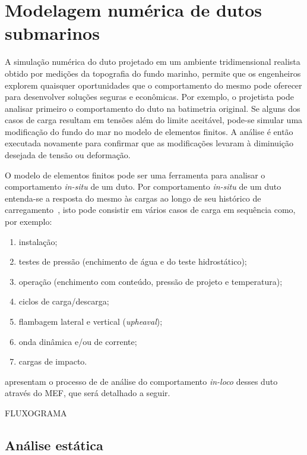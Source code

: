 \section{Modelagem numérica de dutos submarinos\label{chap:assentamento}}


A simulação numérica do duto projetado em um ambiente tridimensional realista obtido por medições da topografia do fundo marinho, permite que os engenheiros explorem quaisquer oportunidades que o comportamento do mesmo pode oferecer para desenvolver soluções seguras e econômicas.
Por exemplo, o projetista pode analisar primeiro o comportamento do duto na batimetria original.
Se alguns dos casos de carga resultam em tensões além do limite aceitável, pode-se simular uma modificação do fundo do mar no modelo de elementos finitos.
A análise é então executada novamente para confirmar que as modificações levaram à diminuição desejada de tensão ou deformação.

O modelo de elementos finitos pode ser uma ferramenta para analisar o comportamento \textit{in-situ} de um duto.
Por comportamento \textit{in-situ} de um duto entenda-se a resposta do mesmo às cargas ao longo de seu histórico de carregamento~\cite{Bai2014}, isto pode consistir em vários casos de carga em sequência como, por exemplo:

\begin{enumerate}
    \item instalação;
    \item testes de pressão (enchimento de água e do teste hidrostático);
    \item operação (enchimento com conteúdo, pressão de projeto e temperatura);
    \item ciclos de carga/descarga;
    \item flambagem lateral e vertical (\textit{upheaval});
    \item onda dinâmica e/ou de corrente;
    \item cargas de impacto.
\end{enumerate}

 apresentam o processo de de análise do comportamento \textit{in-loco} desses duto através do  MEF, que será detalhado a seguir.

FLUXOGRAMA

\subsection{Análise estática}


